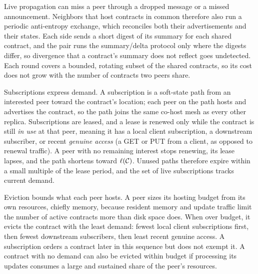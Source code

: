 Live propagation can miss a peer through a dropped message or a missed announcement. Neighbors that host contracts in common therefore also run a periodic anti-entropy exchange, which reconciles both their advertisements and their states. Each side sends a short digest of its summary for each shared contract, and the pair runs the summary/delta protocol only where the digests differ, so divergence that a contract's summary does not reflect goes undetected. Each round covers a bounded, rotating subset of the shared contracts, so its cost does not grow with the number of contracts two peers share.

Subscriptions express demand. A subscription is a soft-state path from an interested peer toward the contract's location; each peer on the path hosts and advertises the contract, so the path joins the same co-host mesh as every other replica. Subscriptions are leased, and a lease is renewed only while the contract is still \emph{in use} at that peer, meaning it has a local client subscription, a downstream subscriber, or recent \emph{genuine access} (a \textsf{GET} or \textsf{PUT} from a client, as opposed to renewal traffic). A peer with no remaining interest stops renewing, its lease lapses, and the path shortens toward $\ell(\mathcal{C})$. Unused paths therefore expire within a small multiple of the lease period, and the set of live subscriptions tracks current demand.

Eviction bounds what each peer hosts. A peer sizes its hosting budget from its own resources, chiefly memory, because resident memory and update traffic limit the number of active contracts more than disk space does. When over budget, it evicts the contract with the least demand: fewest local client subscriptions first, then fewest downstream subscribers, then least recent genuine access. A subscription orders a contract later in this sequence but does not exempt it. A contract with no demand can also be evicted within budget if processing its updates consumes a large and sustained share of the peer's resources.
